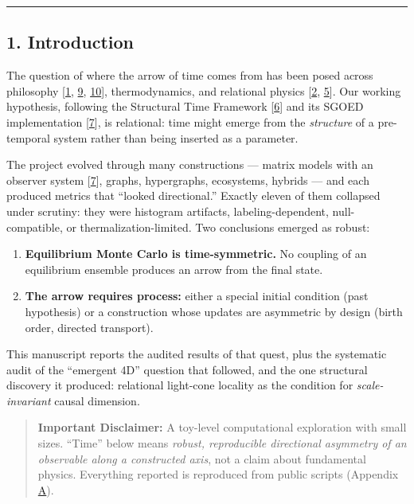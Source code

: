 \begin{center}\rule{0.5\linewidth}{0.5pt}\end{center}

\subsection{1. Introduction}\label{introduction}

The question of where the arrow of time comes from has been posed across
philosophy {[}\hyperref[ref-1]{1}, \hyperref[ref-9]{9},
\hyperref[ref-10]{10}{]}, thermodynamics, and relational physics
{[}\hyperref[ref-2]{2}, \hyperref[ref-5]{5}{]}. Our working hypothesis,
following the Structural Time Framework {[}\hyperref[ref-6]{6}{]} and
its SGOED implementation {[}\hyperref[ref-7]{7}{]}, is relational: time
might emerge from the \emph{structure} of a pre-temporal system rather
than being inserted as a parameter.

The project evolved through many constructions --- matrix models with an
observer system {[}\hyperref[ref-7]{7}{]}, graphs, hypergraphs,
ecosystems, hybrids --- and each produced metrics that ``looked
directional.'' Exactly eleven of them collapsed under scrutiny: they
were histogram artifacts, labeling-dependent, null-compatible, or
thermalization-limited. Two conclusions emerged as robust:

\begin{enumerate}
\def\labelenumi{\arabic{enumi}.}
\tightlist
\item
  \textbf{Equilibrium Monte Carlo is time-symmetric.} No coupling of an
  equilibrium ensemble produces an arrow from the final state.
\item
  \textbf{The arrow requires process:} either a special initial
  condition (past hypothesis) or a construction whose updates are
  asymmetric by design (birth order, directed transport).
\end{enumerate}

This manuscript reports the audited results of that quest, plus the
systematic audit of the ``emergent 4D'' question that followed, and the
one structural discovery it produced: relational light-cone locality as
the condition for \emph{scale-invariant} causal dimension.

\begin{quote}
\textbf{Important Disclaimer:} A toy-level computational exploration
with small sizes. ``Time'' below means \emph{robust, reproducible
directional asymmetry of an observable along a constructed axis}, not a
claim about fundamental physics. Everything reported is reproduced from
public scripts (Appendix \hyperref[appendix-a-reproducibility]{A}).
\end{quote}

